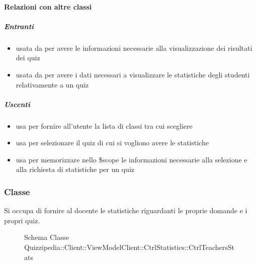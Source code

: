 \paragraph{Relazioni con altre classi}
\subparagraph{Entranti}
\begin{itemize}
\item usata da  per avere le informazioni necessarie alla visualizzazione dei risultati dei quiz
\item usata da  per avere i dati necessari a visualizzare le statistiche degli studenti relativamente a un quiz
\end{itemize}
\subparagraph{Uscenti}
\begin{itemize}
\item usa  per fornire all'utente la lista di classi tra cui scegliere
\item usa  per selezionare il quiz di cui si vogliono avere le statistiche
\item usa  per memorizzare nello \$scope le informazioni necessarie alla selezione e alla richiesta di statistiche per un quiz
\end{itemize}
\subsubsection{Classe }
Si occupa di fornire al docente le statistiche riguardanti le proprie domande e i propri quiz.
\begin{figure}[H]
\centering
\noindent{}
\caption[Schema Classe CtrlTeachersStats]{Schema Classe Quizzipedia::Client::ViewModelClient::CtrlStatistics::CtrlTeachersStats}
\end{figure}
